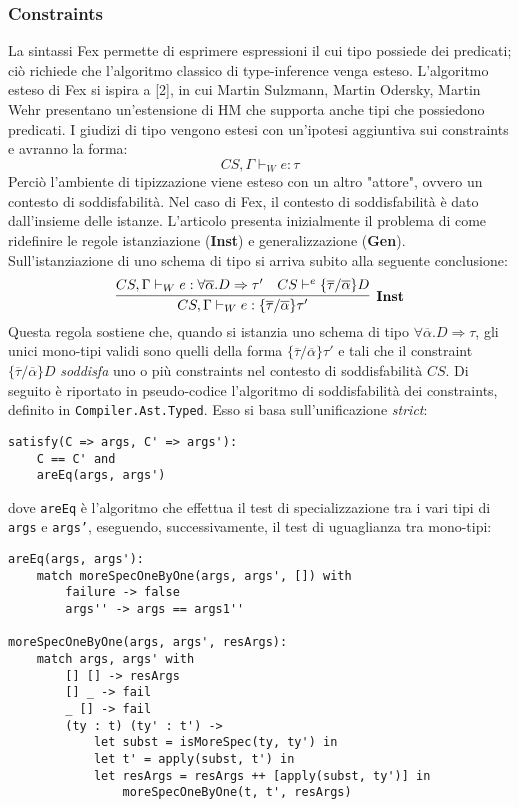 \documentclass[10pt,a4paper]{article}
\begin{document}
\subsubsection{Constraints}
La sintassi Fex permette di esprimere espressioni il cui tipo possiede dei predicati; ciò richiede che l'algoritmo
classico di type-inference venga esteso. L'algoritmo esteso di Fex si ispira a [2], in cui Martin Sulzmann,
Martin Odersky, Martin Wehr presentano un'estensione di HM che supporta anche tipi che possiedono predicati. I giudizi
di tipo vengono estesi con un'ipotesi aggiuntiva sui constraints e avranno la forma:
\[ CS, \Gamma \vdash_W e : \tau \]
Perciò l'ambiente di tipizzazione viene esteso con un altro "attore", ovvero un contesto di soddisfabilità. Nel caso
di Fex, il contesto di soddisfabilità è dato dall'insieme delle istanze.
L'articolo presenta inizialmente il problema di come ridefinire le regole istanziazione (\textbf{Inst}) e generalizzazione
(\textbf{Gen}). Sull'istanziazione di uno schema di tipo si arriva subito alla seguente conclusione:
\[ \infer[\textbf{Inst}]{CS, \Gamma \vdash_W e : \{ \overline{\tau} / \overline{\alpha} \}\tau'}{CS, \Gamma \vdash_W e : \forall \overline{\alpha}. D \Rightarrow \tau' & CS \vdash^e \{ \overline{\tau} / \overline{\alpha} \} D} \]
Questa regola sostiene che, quando si istanzia uno schema di tipo $ \forall \overline{\alpha}. D \Rightarrow \tau $, gli
unici mono-tipi validi sono quelli della forma $ \{ \overline{\tau} / \overline{\alpha} \} \tau' $ e tali che il constraint
$ \{ \overline{\tau} / \overline{\alpha} \}D $ \textit{soddisfa} uno o più constraints nel contesto di soddisfabilità $ CS $.
Di seguito è riportato in pseudo-codice l'algoritmo di soddisfabilità dei constraints, definito in
\texttt{Compiler.Ast.Typed}. Esso si basa sull'unificazione \textit{strict}:
\begin{lstlisting}
satisfy(C => args, C' => args'):
    C == C' and
    areEq(args, args')
\end{lstlisting}
dove \texttt{areEq} è l'algoritmo che effettua il test di specializzazione tra i vari tipi di \texttt{args}
e \texttt{args'}, eseguendo, successivamente, il test di uguaglianza tra mono-tipi:
\begin{lstlisting}
areEq(args, args'):
    match moreSpecOneByOne(args, args', []) with
        failure -> false
        args'' -> args == args1''

moreSpecOneByOne(args, args', resArgs):
    match args, args' with
        [] [] -> resArgs
        [] _ -> fail
        _ [] -> fail
        (ty : t) (ty' : t') ->
            let subst = isMoreSpec(ty, ty') in
            let t' = apply(subst, t') in
            let resArgs = resArgs ++ [apply(subst, ty')] in
                moreSpecOneByOne(t, t', resArgs)
\end{lstlisting}
\end{document}
